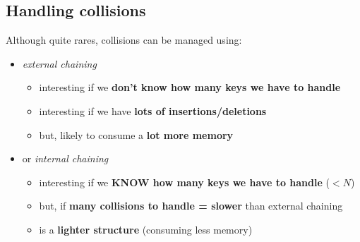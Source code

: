 \documentclass{beamer}[10pt, usepdftitle=false, handout]
\begin{document}
	\subsection{Handling collisions}
	\begin{frame}
	
	Although quite rares, collisions can be managed using:
	
	\vspace*{1em}	
	
	\begin{itemize}
	\item {\textit{external chaining}
		\begin{itemize}
		\item {interesting if we \textbf{don't know how many keys we have to handle}}
		\item {interesting if we have \textbf{lots of insertions/deletions}}
		\item {but, likely to consume a \textbf{lot more memory}}			
		\end{itemize}			
	}	
	\item {or \textit{internal chaining}
		\begin{itemize}
		\item {interesting if we \textbf{KNOW how many keys we have to handle} ($<N$)}
		\item {but, if \textbf{many collisions to handle = slower} than external chaining}
		\item {is a \textbf{lighter structure} (consuming less memory)} 
		\end{itemize}			
	}	
	\end{itemize}		
		
	\end{frame}
	
\end{document}
